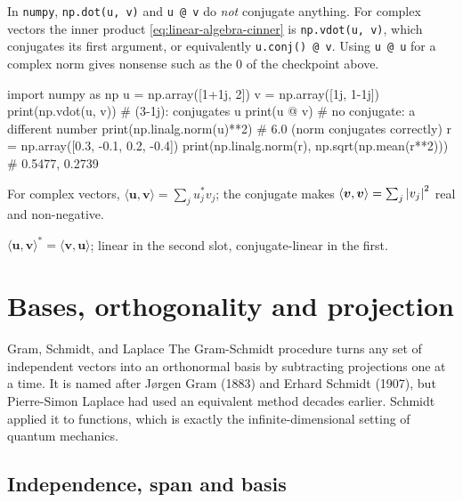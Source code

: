 \begin{pitfall}
In \texttt{numpy}, \texttt{np.dot(u, v)} and \texttt{u @ v} do \emph{not} conjugate anything. For complex vectors the inner product \cref{eq:linear-algebra-cinner} is \texttt{np.vdot(u, v)}, which conjugates its first argument, or equivalently \texttt{u.conj() @ v}. Using \texttt{u @ u} for a complex norm gives nonsense such as the $0$ of the checkpoint above.
\end{pitfall}

\begin{pycode}
import numpy as np
u = np.array([1+1j, 2])
v = np.array([1j, 1-1j])
print(np.vdot(u, v))           # (3-1j): conjugates u
print(u @ v)                   # no conjugate: a different number
print(np.linalg.norm(u)**2)    # 6.0 (norm conjugates correctly)
r = np.array([0.3, -0.1, 0.2, -0.4])
print(np.linalg.norm(r), np.sqrt(np.mean(r**2)))   # 0.5477, 0.2739
\end{pycode}

\begin{keyideas}
\item For complex vectors, $\langle\bm u,\bm v\rangle=\sum_ju_j^*v_j$; the conjugate makes $\langle\bm v,\bm v\rangle=\sum_j\left\lvert v_j\right\rvert^2$ real and non-negative.
\item $\langle\bm u,\bm v\rangle^*=\langle\bm v,\bm u\rangle$; linear in the second slot, conjugate-linear in the first.
\end{keyideas}

\section{Bases, orthogonality and projection}\label{sec:linear-algebra-basis}
\begin{didyouknow}{Gram, Schmidt, and Laplace}
The Gram-Schmidt procedure turns any set of independent vectors into an orthonormal basis by subtracting projections one at a time. It is named after J{\o}rgen Gram (1883) and Erhard Schmidt (1907), but Pierre-Simon Laplace had used an equivalent method decades earlier. Schmidt applied it to functions, which is exactly the infinite-dimensional setting of quantum mechanics.
\end{didyouknow}

\subsection{Independence, span and basis}


